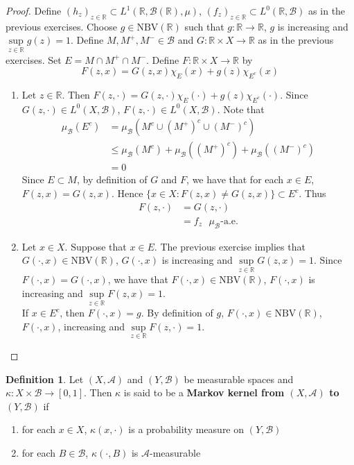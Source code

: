 \documentclass{book}
\theoremstyle{definition}
\newtheorem{defn}[definition]{Definition}
\newcommand{\kap}{\kappa}
\newcommand{\R}{\mathbb{R}}
\newcommand{\MA}{\mathcal{A}}
\newcommand{\MB}{\mathcal{B}}
\DeclareMathOperator*{\0}{\mbf{0}}
\DeclareMathOperator*{\1}{\mbf{1}}
\newcommand{\NBV}{\text{NBV}}
\begin{document}
	\begin{proof}
		Define $(h_z)_{z \in \R} \subset L^1(\R, \MB(\R), \mu)$, $(f_z)_{z \in \R} \subset L^0(\R, \MB)$ as in the previous exercises. Choose $g \in \NBV(\R)$ such that $g: \R \rightarrow \R$, $g$ is increasing and $\sup\limits_{z \in \R} g(z) = 1$. Define $M, M^+, M^- \in \MB$ and $G: \R \times X \rightarrow \R$ as in the previous exercises. Set $E = M \cap M^+ \cap M^-$. Define $F: \R \times X \rightarrow \R$ by 
		\[
		F(z, x) = G(z, x) \chi_{E}(x) + g(z) \chi_{E^c}(x)
		\]
		\begin{enumerate}
			\item Let $z \in \R$. Then $F(z, \cdot) = G(z, \cdot) \chi_{E}(\cdot) + g(z) \chi_{E^c}(\cdot)$. Since $G(z, \cdot) \in L^0(X, \MB)$, $F(z, \cdot) \in L^0(X, \MB)$. 
			Note that
			\begin{align*}
				\mu_{\MB}(E^c)
				& = \mu_{\MB}(M^c \cup (M^+)^c \cup (M^-)^c) \\  
				& \leq \mu_{\MB}(M^c) + \mu_{\MB}((M^+)^c) + \mu_{\MB}((M^-)^c) \\
				& = 0
			\end{align*}
			Since $E \subset M$, by definition of $G$ and $F$, we have that for each $x \in E$, $F(z, x) = G(z, x)$. Hence $\{x \in X: F(z, x) \neq G(z, x)\} \subset E^c$. Thus 
			\begin{align*}
				F(z, \cdot) 
				& = G(z, \cdot) \\
				& = f_z \text{ $\mu_{\MB}$-a.e.}
			\end{align*}
			\item Let $x \in X$. Suppose that $x \in E$. The previous exercise implies that $G(\cdot, x) \in \NBV(\R)$, $G(\cdot, x)$ is increasing and $\sup\limits_{z \in \R} G(z, x) = 1$. Since $F(\cdot, x) = G(\cdot, x)$, we have that $F(\cdot, x) \in \NBV(\R)$, $F(\cdot, x)$ is increasing and $\sup\limits_{z \in \R} F(z, x) = 1$. \\
			If $x \in E^c$, then $F(\cdot, x) = g$. By definition of $g$, $F(\cdot, x) \in \NBV(\R)$, $F(\cdot, x)$, increasing and $\sup\limits_{z \in \R} F(z, \cdot) = 1$.
		\end{enumerate}
	\end{proof}
	
	\begin{defn}
		Let $(X, \MA)$ and $(Y, \MB)$ be  measurable spaces and $\kap: X \times \MB \rightarrow [0,1]$. Then $\kap$ is said to be a \textbf{Markov kernel from $(X, \MA)$ to $(Y, \MB)$} if 
		\begin{enumerate}
			\item for each $x \in X$, $\kap(x, \cdot)$ is a probability measure on $(Y, \MB)$
			\item for each $B \in \MB$, $\kap(\cdot, B)$ is $\MA$-measurable
		\end{enumerate}
	\end{defn}
\end{document}
